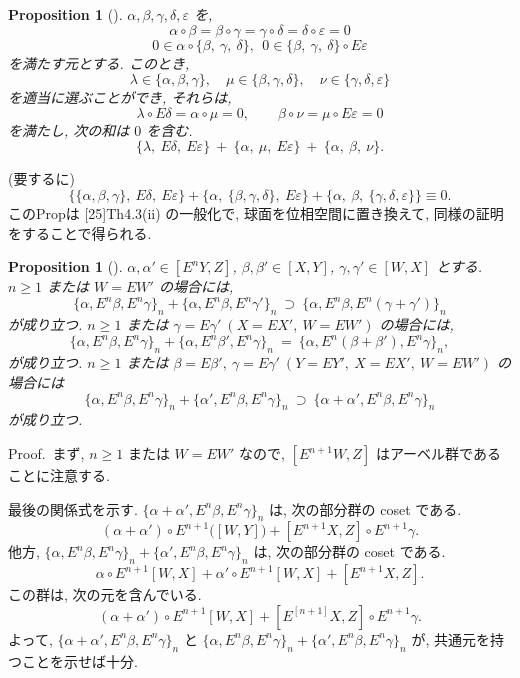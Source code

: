 \documentclass[12pt, leqno]{ltjsarticle}
\newcommand{\Ex}{E}        %
\numberwithin{equation}{section}
\theoremstyle{plain}
\newtheorem{proposition}[theorem]{Proposition}
\theoremstyle{definition}
\theoremstyle{remark}
\begin{document}

\begin{proposition}[]\label{prop:1-5}
$\alpha,\beta,\gamma,\delta,\varepsilon$ を,
\[
\alpha\circ \beta=\beta\circ\gamma=\gamma\circ\delta=\delta\circ\varepsilon=0
\]
\[
0\in \alpha\circ\{\beta,\ \gamma,\ \delta\}, \ \ 0\in\{\beta,\ \gamma,\ \delta\}\circ\Ex\varepsilon
\]
を満たす元とする. このとき,
\[
\lambda\in\{\alpha,\beta,\gamma\},\quad
\mu\in\{\beta,\gamma,\delta\},\quad
\nu\in\{\gamma,\delta,\varepsilon\}
\]
を適当に選ぶことができ, それらは,
\[
\lambda\circ \Ex\delta=\alpha\circ \mu=0,\qquad
\beta\circ \nu=\mu\circ \Ex\varepsilon=0
\]
を満たし, 次の和は $0$ を含む. 
\[
\{\lambda,\ \Ex\delta,\ \Ex\varepsilon\}
\ +\
\{\alpha,\ \mu,\ \Ex\varepsilon\}
\ +\
\{\alpha,\ \beta,\ \nu\}.
\]
\end{proposition}

\noindent (要するに) 
\[
\{\{\alpha,\beta,\gamma\},\ E\delta,\ E\varepsilon\}
+\{\alpha,\ \{\beta,\gamma,\delta\},\ E\varepsilon\}
+\{\alpha,\ \beta,\ \{\gamma,\delta,\varepsilon\}\}
\equiv0 .
\]
このPropは [25]Th4.3(ii) の一般化で, 球面を位相空間に置き換えて, 
同様の証明をすることで得られる. 

\begin{proposition}[]\label{prop:1-6}
$\alpha,\alpha'\in[\Ex^n Y, Z]$, $\beta,\beta'\in[X, Y]$, 
$\gamma,\gamma'\in[W, X]$ とする. \\
$n\ge 1$ \emph{または} $W=\Ex W'$ の場合には,
\[
\{\alpha,\Ex^n\beta,\Ex^n\gamma\}_n
+
\{\alpha,\Ex^n\beta,\Ex^n\gamma'\}_n
\ \supset\
\{\alpha,\Ex^n\beta,\Ex^n(\gamma+\gamma')\}_n
\]
が成り立つ. 
$n\ge 1$ \emph{または} $\gamma=\Ex\gamma' \ (X=\Ex X',\ W=\Ex W')$ の場合には,
\[
\{\alpha,\Ex^n\beta,\Ex^n\gamma\}_n
+
\{\alpha,\Ex^n\beta',\Ex^n\gamma\}_n
\ =\
\{\alpha,\Ex^n(\beta+\beta'),\Ex^n\gamma\}_n,
\]
が成り立つ. $n\ge 1$ \emph{または} $\beta=\Ex\beta',\ \gamma=\Ex\gamma' \ (Y=\Ex Y',\ X=\Ex X',\ W=\Ex W')$ の場合には
\[
\{\alpha,\Ex^n\beta,\Ex^n\gamma\}_n
+
\{\alpha',\Ex^n\beta,\Ex^n\gamma\}_n
\ \supset\
\{\alpha+\alpha',\Ex^n\beta,\Ex^n\gamma\}_n
\]
が成り立つ. 
\end{proposition}

Proof.\
まず, 
\(n\ge1\) または \(W=EW'\) なので, 
\([\Ex^{n+1}W,Z]\) はアーベル群であることに注意する.

最後の関係式を示す. 
\(
\{\alpha+\alpha',\Ex^n\beta,\Ex^n\gamma\}_n
\)
は, 次の部分群の coset である. 
\[
(\alpha+\alpha')\circ \Ex^{n+1}\!\bigl([W, Y]\bigr) 
+ [\Ex^{n+1}X, Z]\circ \Ex^{n+1}\gamma.
\]
他方, 
\(
\{\alpha,\Ex^n\beta,\Ex^n\gamma\}_n + \{\alpha',\Ex^n\beta,\Ex^n\gamma\}_n
\)
は, 次の部分群の coset である.
\[
\alpha\circ E^{n+1}[W,X]
+ \alpha'\circ E^{n+1}[W,X]
+ [E^{n+1}X,Z].
\]
この群は, 次の元を含んでいる.
\[
(\alpha + \alpha') \circ E^{n+1}[W,X]
+ [E^[n+1]X,Z] \circ E^{n+1}\gamma.
\]
よって,
\(
\{\alpha+\alpha',\Ex^n\beta,\Ex^n\gamma\}_n
\)
と
\(
\{\alpha,\Ex^n\beta,\Ex^n\gamma\}_n + \{\alpha',\Ex^n\beta,\Ex^n\gamma\}_n
\)
が, 共通元を持つことを示せば十分.
\end{document}
